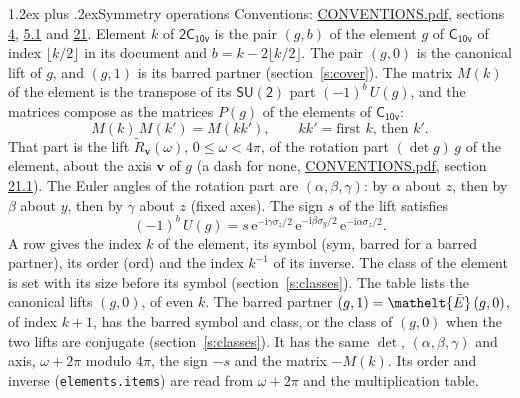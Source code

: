 \documentclass[10pt,a4paper]{article}
\makeatletter
\renewcommand\section{\@startsection{section}{1}{\z@}{-3ex plus -1ex minus -.2ex}%
  {1.2ex plus .2ex}{\normalfont\large\sffamily\bfseries\color{parttitle}}}
\numberwithin{equation}{section}
\newcommand{\eltfont}[1]{{\let\sigma\eltsigma\mathelt{#1}}}
\newcommand{\grp}[1]{\mathsf{#1}}
\newcommand{\elt}[1]{\eltfont{#1}}
\newcommand{\vv}{\mathbf{v}}
\newcommand{\iunit}{\mathrm{i}}
\newcommand{\expe}{\mathrm{e}}
\newcommand{\barred}[1]{\bar{#1}}
\newcommand{\lift}[1]{\tilde{#1}}
\newcommand{\pauli}[1]{\sigma_{#1}}
\makeatother
\begin{document}
\section{Symmetry operations}\label{s:elements}
Conventions: \href{../../CONVENTIONS.pdf}{CONVENTIONS.pdf}, sections \href{../../../rotation/CONVENTIONS.pdf\#conv.4}{4}, \href{../../../rotation/CONVENTIONS.pdf\#conv.5.1}{5.1} and \href{../../CONVENTIONS.pdf\#conv.21}{21}.
\leavevmode\label{n:index.element}\label{n:element.g}Element $k$ of $\grp{2C_{10v}}$ is the pair $(g, b)$ of the element $g$ of \href{../../../rotation/data/pdf/C10v.pdf}{$\grp{C_{10v}}$} of index $\lfloor k/2\rfloor$ in its document and $b = k - 2\lfloor k/2\rfloor$. The pair $(g, 0)$ is the canonical lift of $g$, and $(g, 1)$ is its barred partner (section~\ref{s:cover}). \label{n:matrix.element.pin}\label{n:matrix.element}The matrix $M(k)$ of the element is the transpose of its $\grp{SU(2)}$ part $(-1)^{b}\,U(g)$, and the matrices compose as the matrices $P(g)$ of the elements of $\grp{C_{10v}}$:
\begin{equation}\label{e:mprod}M(k)\,M(k') = M(kk'),\qquad kk' = \text{first } k\text{, then } k'.\end{equation}
\leavevmode\label{n:angle.omega}\label{n:vector.axis}\label{n:vector.pole}That part is the lift $\lift{R}_{\vv}(\omega)$, $0 \le \omega < 4\pi$, of the rotation part $(\det g)\,g$ of the element, about the axis $\vv$ of $g$ (a dash for none, \href{../../CONVENTIONS.pdf}{CONVENTIONS.pdf}, section \href{../../CONVENTIONS.pdf\#conv.21.1}{21.1}). \label{n:angle.euler.alpha}\label{n:angle.euler.beta}\label{n:angle.euler.gamma}\label{n:vector.coordinates}The Euler angles of the rotation part are $(\alpha,\beta,\gamma)$: by $\alpha$ about $z$, then by $\beta$ about $y$, then by $\gamma$ about $z$ (fixed axes). \label{n:local.euler.sign}The sign $s$ of the lift satisfies
\begin{equation}\label{e:euler}(-1)^{b}\,U(g) = s\,\expe^{-\iunit\gamma\pauli{z}/2}\,\expe^{-\iunit\beta\pauli{y}/2}\,\expe^{-\iunit\alpha\pauli{z}/2}.\end{equation}
\leavevmode\label{n:index.element.inverse}\label{n:head.sym}\label{n:head.ord}A row gives the index $k$ of the element, its symbol (sym, barred for a barred partner), its order (ord) and the index $k^{-1}$ of its inverse. \label{n:head.class}The class of the element is set with its size before its symbol (section~\ref{s:classes}).
The table lists the canonical lifts $(g, 0)$, of even $k$. The barred partner $(g, 1) = \elt{\barred{E}}\,(g, 0)$, of index $k + 1$, has the barred symbol and class, or the class of $(g, 0)$ when the two lifts are conjugate (section~\ref{s:classes}). It has the same $\det$, $(\alpha,\beta,\gamma)$ and axis, $\omega + 2\pi$ modulo $4\pi$, the sign $-s$ and the matrix $-M(k)$. Its order and inverse (\texttt{elements.items}) are read from $\omega + 2\pi$ and the multiplication table.
\end{document}
